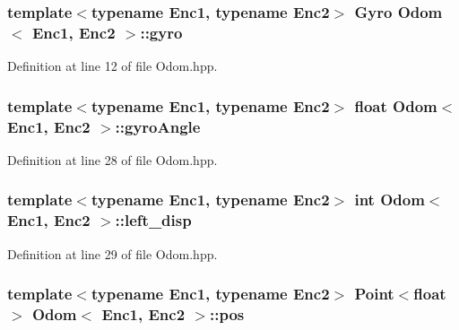 \hypertarget{classOdom_a52380c80a1c7072904a766a59e09d3b5}{
\subsubsection[{gyro}]{\setlength{\rightskip}{0pt plus 5cm}template$<$typename Enc1, typename Enc2$>$ {\bf Gyro} {\bf Odom}$<$ Enc1, Enc2 $>$\-::gyro\hspace{0.3cm}{\ttfamily [private]}}}\label{classOdom_a52380c80a1c7072904a766a59e09d3b5}


Definition at line 12 of file Odom.\-hpp.

\hypertarget{classOdom_a4c4c2d005150e15fef0db14e923bfca3}{
\subsubsection[{gyro\-Angle}]{\setlength{\rightskip}{0pt plus 5cm}template$<$typename Enc1, typename Enc2$>$ float {\bf Odom}$<$ Enc1, Enc2 $>$\-::gyro\-Angle}}\label{classOdom_a4c4c2d005150e15fef0db14e923bfca3}


Definition at line 28 of file Odom.\-hpp.

\hypertarget{classOdom_aa29154456ebb189815df2501cc8eb2fd}{
\subsubsection[{left\-\_\-disp}]{\setlength{\rightskip}{0pt plus 5cm}template$<$typename Enc1, typename Enc2$>$ int {\bf Odom}$<$ Enc1, Enc2 $>$\-::left\-\_\-disp}}\label{classOdom_aa29154456ebb189815df2501cc8eb2fd}


Definition at line 29 of file Odom.\-hpp.

\hypertarget{classOdom_a0e43d9feb433dec91e7a08cee64d732b}{
\subsubsection[{pos}]{\setlength{\rightskip}{0pt plus 5cm}template$<$typename Enc1, typename Enc2$>$ {\bf Point}$<$float$>$ {\bf Odom}$<$ Enc1, Enc2 $>$\-::pos\hspace{0.3cm}{\ttfamily [private]}}}\label{classOdom_a0e43d9feb433dec91e7a08cee64d732b}


